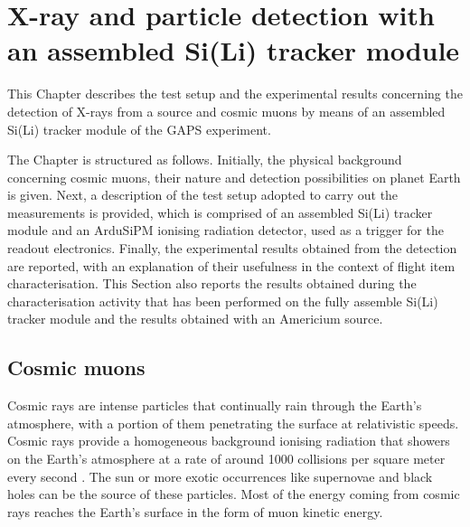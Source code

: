 \chapter[X-ray and particle detection with an assembled Si(Li) tracker\\ module]{X-ray and particle detection with an assembled Si(Li) tracker module} \label{ch3}

This Chapter describes the test setup and the experimental results concerning the detection of X-rays from a  source and cosmic muons by means of an assembled Si(Li) tracker module of the GAPS experiment.

\par
The Chapter is structured as follows. Initially, the physical background concerning cosmic muons, their nature and detection possibilities on planet Earth is given. Next, a description of the test setup adopted to carry out the measurements is provided, which is comprised of an assembled Si(Li) tracker module and an ArduSiPM ionising radiation detector, used as a trigger for the readout electronics. Finally, the experimental results obtained from the detection are reported, with an explanation of their usefulness in the context of flight item characterisation. This Section also reports the results obtained during the characterisation activity that has been performed on the fully assemble Si(Li) tracker module and the results obtained with an Americium source.


\section{Cosmic muons}

Cosmic rays are intense particles that continually rain through the Earth's atmosphere, with a portion of them penetrating the surface at relativistic speeds. Cosmic rays provide a homogeneous background ionising radiation that showers on the Earth's atmosphere at a rate of around 1000 collisions per square meter every second \cite{uretsky_1997_penetration}. The sun or more exotic occurrences like supernovae and black holes can be the source of these particles. Most of the energy coming from cosmic rays reaches the Earth's surface in the form of muon kinetic energy.

